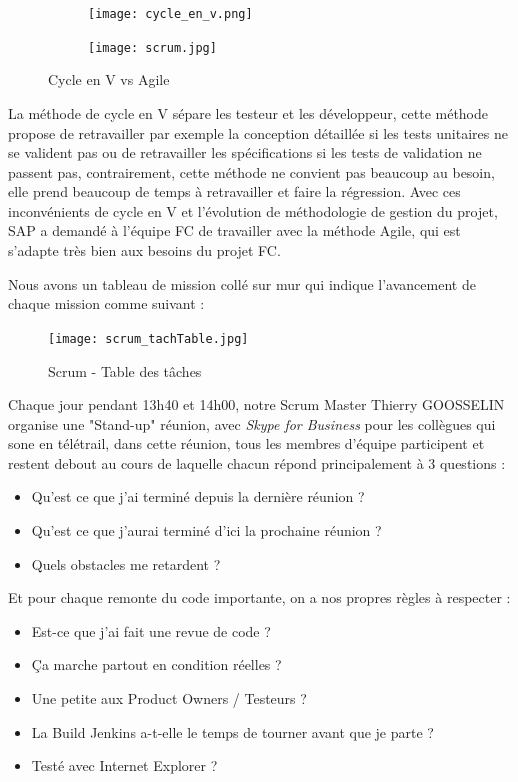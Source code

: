     \begin{figure}[H]
       	\centering
    	\begin{subfigure}[b]{.4\textwidth}
    		\texttt{[image: cycle\_en\_v.png]}
    	\end{subfigure}
    	\begin{subfigure}[b]{.59\textwidth}
    		\texttt{[image: scrum.jpg]}
    	\end{subfigure}
    	
    	\caption{Cycle en V vs Agile}
    	\label{fig: cycle_en_v}
    \end{figure}
    La méthode de cycle en V sépare les testeur et les développeur, cette méthode propose de retravailler par exemple la conception détaillée si les tests unitaires ne se valident pas ou de retravailler les spécifications si les tests de validation ne passent pas, contrairement, cette méthode ne convient pas beaucoup au besoin, elle prend beaucoup de temps à retravailler et faire la régression. Avec ces inconvénients de cycle en V et l'évolution de méthodologie de gestion du projet, SAP a demandé à l'équipe FC de travailler avec la méthode Agile, qui est s'adapte très bien aux besoins du projet FC. 
    
    \par Nous avons un tableau de mission collé sur mur qui indique l'avancement de chaque mission comme suivant : 
    \begin{figure}[H]
        \centering
        \texttt{[image: scrum\_tachTable.jpg]}
        \caption{Scrum - Table des tâches}
        \label{fig:scrum_figure}
    \end{figure}
    \par Chaque jour pendant 13h40 et 14h00, notre Scrum Master Thierry GOOSSELIN organise une "Stand-up" réunion, avec \textit{Skype for Business} pour les collègues qui sone en télétrail, dans cette réunion, tous les membres d'équipe participent et restent debout au cours de laquelle chacun répond principalement à 3 questions : 
    \begin{itemize}[label=\textbullet]
        \item Qu'est ce que j'ai terminé depuis la dernière réunion ?
        \item Qu'est ce que j'aurai terminé d'ici la prochaine réunion ?
        \item Quels obstacles me retardent ?
    \end{itemize}
    
    \par Et pour chaque remonte du code importante, on a nos propres règles à respecter : 
    \begin{itemize}[label=\textbullet]
        \item Est-ce que j'ai fait une revue de code ?
        \item Ça marche partout en condition réelles ?
        \item Une petite aux Product Owners / Testeurs ?
        \item La Build Jenkins a-t-elle le temps de tourner avant que je parte ?
        \item Testé avec Internet Explorer ?
    \end{itemize}

